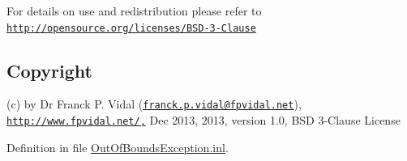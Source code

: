 For details on use and redistribution please refer to \href{http://opensource.org/licenses/BSD-3-Clause}{\tt http://opensource.org/licenses/BSD-\/3-\/Clause}\hypertarget{_x_ray_renderer_8inl_Copyright}{}\subsection{Copyright}\label{_x_ray_renderer_8inl_Copyright}
(c) by Dr Franck P. Vidal (\href{mailto:franck.p.vidal@fpvidal.net}{\tt franck.p.vidal@fpvidal.net}), \href{http://www.fpvidal.net/,}{\tt http://www.fpvidal.net/,} Dec 2013, 2013, version 1.0, BSD 3-\/Clause License 

Definition in file \hyperlink{_out_of_bounds_exception_8inl_source}{OutOfBoundsException.inl}.

